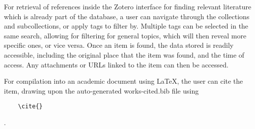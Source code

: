 For retrieval of references inside the Zotero interface for finding relevant literature which is already part of the database, a user can navigate through the collections and subcollections, or apply tags to filter by.
Multiple tags can be selected in the same search, allowing for filtering for general topics, which will then reveal more specific ones, or vice versa. 
Once an item is found, the data stored is readily accessible, including the original place that the item was found, and the time of access. 
Any attachments or URLs linked to the item can then be accessed.

For compilation into an academic document using LaTeX, the user can cite the item, drawing upon the auto-generated works-cited.bib file using \begin{verbatim}
    \cite{}
\end{verbatim}.